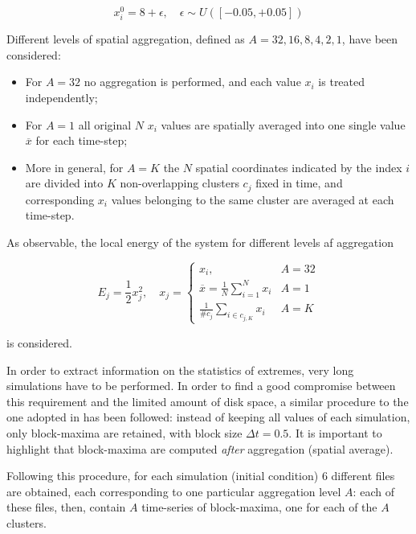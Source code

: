 \documentclass{article}
\begin{document}
\begin{equation}
x_i^0 = 8 + \epsilon, \quad \epsilon \sim U([-0.05,+0.05])
\end{equation}

Different levels of spatial aggregation, defined as $A=32,16,8,4,2,1$, have been considered:

\begin{itemize}
	\item For $A=32$ no aggregation is performed, and each value $x_i$ is treated independently;
	\item For $A=1$ all original $N$ $x_i$ values are spatially averaged into one single value $\overline{x}$ for each time-step;
	\item More in general, for $A=K$ the $N$ spatial coordinates indicated by the index $i$ are divided into $K$ non-overlapping clusters $c_j$ fixed in time, and corresponding $x_i$ values belonging to the same cluster are averaged at each time-step.
\end{itemize}

As observable, the local energy of the system for different levels af aggregation

\begin{equation}
E_j=\frac{1}{2}x_j^2, \quad x_j=
	\begin{cases}
   		x_i, & A=32\\
   		\overline{x} = \frac{1}{N} \sum_{i=1}^{N} x_i & A=1 \\
		\frac{1}{\#c_j} \sum_{i \in c_{j, K}} x_i & A=K
	\end{cases}
\end{equation}

is considered.

In order to extract information on the statistics of extremes, very long simulations have to be performed. In order to find a good compromise between this requirement and the limited amount of disk space, a similar procedure to the one adopted in \cite{Galfi} has been followed: instead of keeping all values of each simulation, only block-maxima are retained, with block size $\Delta t = 0.5$. It is important to highlight that block-maxima are computed \textit{after} aggregation (spatial average).

Following this procedure, for each simulation (initial condition) 6 different files are obtained, each corresponding to one particular aggregation level $A$: each of these files, then, contain $A$ time-series of block-maxima, one for each of the $A$ clusters.
\end{document}
